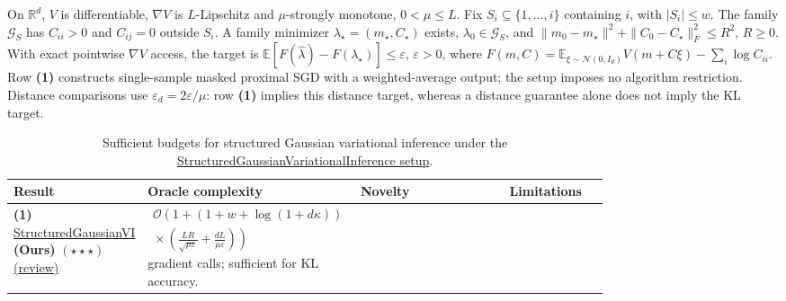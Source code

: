 \begin{table}[tp]
\centering
\caption{Sufficient budgets for structured Gaussian variational inference under the \href{https://github.com/k3nfalt/longtails/blob/main/LongTails/Setups/StructuredGaussianVariationalInference.lean}{StructuredGaussianVariationalInference setup}.}\label{tab:StructuredGaussianVariationalInference}
\parbox{\linewidth}{\footnotesize On $\mathbb R^d$, $V$ is differentiable, $\nabla V$ is $L$-Lipschitz and $\mu$-strongly monotone, $0<\mu\le L$. Fix $S_i\subseteq\{1,\ldots,i\}$ containing $i$, with $|S_i|\le w$. The family $\mathcal G_S$ has $C_{ii}>0$ and $C_{ij}=0$ outside $S_i$. A family minimizer $\lambda_\star=(m_\star,C_\star)$ exists, $\lambda_0\in\mathcal G_S$, and $\|m_0-m_\star\|^2+\|C_0-C_\star\|_F^2\le R^2$, $R\ge0$. With exact pointwise $\nabla V$ access, the target is $\mathbb E[F(\widehat\lambda)-F(\lambda_\star)]\le\varepsilon$, $\varepsilon>0$, where $F(m,C)=\mathbb E_{\xi\sim\mathcal N(0,I_d)}V(m+C\xi)-\sum_i\log C_{ii}$. Row \textbf{(1)} constructs single-sample masked proximal SGD with a weighted-average output; the setup imposes no algorithm restriction. Distance comparisons use $\varepsilon_d=2\varepsilon/\mu$: row \textbf{(1)} implies this distance target, whereas a distance guarantee alone does not imply the KL target.}\par\smallskip
\begin{threeparttable}
\footnotesize
\setlength{\tabcolsep}{4pt}\renewcommand{\arraystretch}{1.25}
\begin{tabularx}{\linewidth}{@{}>{\raggedright\arraybackslash}p{0.20\linewidth}>{\raggedright\arraybackslash}p{0.32\linewidth}>{\raggedright\arraybackslash}p{0.25\linewidth}>{\raggedright\arraybackslash}X@{}}
\toprule
\textbf{Result} & \textbf{Oracle complexity} & \textbf{Novelty} & \textbf{Limitations} \\
\midrule
\textbf{(1)} \href{https://github.com/k3nfalt/longtails/blob/main/LongTails/Theorems/StructuredGaussianVI.lean}{Structured\allowbreak Gaussian\allowbreak VI} \textbf{(Ours)} $(\star\star\star)$ \href{https://github.com/k3nfalt/longtails/blob/main/scripts/reviews/StructuredGaussianVI.md}{(review)}
& $\displaystyle\begin{gathered}\mathcal{O}\!\left(1+(1+w+\log(1+d\kappa))\right.\\[-2pt]\left.{}\times\left(\frac{LR}{\sqrt{\mu\varepsilon}}+\frac{dL}{\mu\varepsilon}\right)\right)\end{gathered}$ gradient calls; sufficient for KL accuracy.
& & \\

\end{tabularx}
\end{threeparttable}
\end{table}
